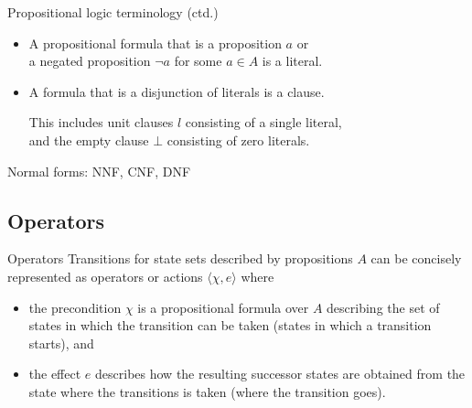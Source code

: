 \documentclass{gkibeamer}
\begin{document}
\begin{frame}{Propositional logic terminology (ctd.)}
  \begin{itemize}
  \item A propositional formula that is a proposition $a$ or \\
    a negated proposition $\neg a$ for some $a \in A$ is a \alert{literal}.
  \item A formula that is a disjunction of literals is a
    \alert{clause}.

    This includes \alert{unit clauses} $l$ consisting of a single
    literal, \\
    and the \alert{empty clause} $\bot$ consisting of zero literals.
  \end{itemize}

  \alert{Normal forms:} NNF, CNF, DNF
\end{frame}

\subsection{Operators}

\begin{frame}{Operators}
  Transitions for state sets described by propositions $A$ can be
  concisely represented as \alert{operators} or \alert{actions}
  $\langle \chi, e\rangle$ where
  \begin{itemize}
  \item the \alert{precondition} $\chi$ is a propositional formula
    over $A$ describing the set of states in which the transition can
    be taken (states in which a transition starts), and
  \item the \alert{effect} $e$ describes how the resulting successor
    states are obtained from the state where the transitions is taken
    (where the transition goes).
  \end{itemize}
\end{frame}
\end{document}
